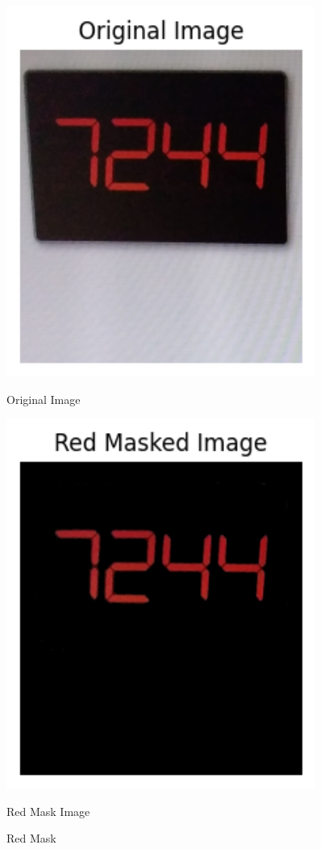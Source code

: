 \begin{figure}[h]
    \centering
    \begin{minipage}{0.45\textwidth}
        \centering
        \includegraphics[width=0.9\textwidth]{Figures/red_mask/original.png}
        \caption*{Original Image}
    \end{minipage}\hfill
    \begin{minipage}{0.45\textwidth}
        \centering
        \includegraphics[width=0.9\textwidth]{Figures/red_mask/red_mask.png}
        \caption*{Red Mask Image}
    \end{minipage}
    \caption{Red Mask}
\end{figure}


